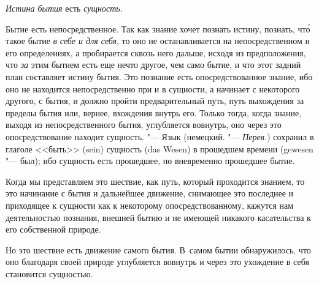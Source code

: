 \clearpage
{\em Истина бытия} есть {\em сущность}.

Бытие есть непосредственное. Так как знание хочет познать истину, познать,
чт\'{о} такое бытие {\em в себе и для себя}, то оно не
останавливается на непосредственном и его определениях, а пробирается
сквозь него дальше, исходя из предположения, что
{\em за} этим бытием есть еще нечто другое, чем само
бытие, и что этот задний план составляет истину бытия. Это познание есть
опосредствованное знание, ибо оно не находится непосредственно при и в
сущности, а начинает с некоторого другого, с бытия, и должно пройти
предварительный путь, путь выхождения за пределы бытия или, вернее,
вхождения внутрь его. Только тогда, когда знание, выходя из
непосредственного бытия, углубляется вовнутрь, оно через это
опосредствование находит сущность. "--- Язык (немецкий. "--- {\em Перев.})
сохранил в глаголе <<быть>> (sein) сущность (das Wesen) в прошедшем времени
(gewesen "--- был); ибо сущность есть прошедшее, но вневременно прошедшее
бытие.

Когда мы представляем это шествие, как путь, который проходится знанием, то
это начинание с бытия и дальнейшее движение, снимающее это последнее и
приходящее к сущности как к некоторому опосредствованному, кажутся нам
деятельностью познания, внешней бытию и не имеющей никакого касательства к
его собственной природе.

Но это шествие есть движение самого бытия. В~самом бытии обнаружилось, что
оно благодаря своей природе углубляется вовнутрь и через это ухождение в
себя становится сущностью.

